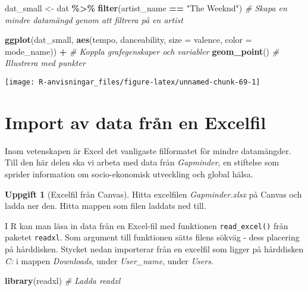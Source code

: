 \documentclass[
]{book}
\newenvironment{Shaded}{\begin{snugshade}}{\end{snugshade}}
\newcommand{\AttributeTok}[1]{\textcolor[rgb]{0.13,0.29,0.53}{#1}}
\newcommand{\CommentTok}[1]{\textcolor[rgb]{0.56,0.35,0.01}{\textit{#1}}}
\newcommand{\FunctionTok}[1]{\textcolor[rgb]{0.13,0.29,0.53}{\textbf{#1}}}
\newcommand{\NormalTok}[1]{#1}
\newcommand{\OtherTok}[1]{\textcolor[rgb]{0.56,0.35,0.01}{#1}}
\newcommand{\SpecialCharTok}[1]{\textcolor[rgb]{0.81,0.36,0.00}{\textbf{#1}}}
\newcommand{\StringTok}[1]{\textcolor[rgb]{0.31,0.60,0.02}{#1}}
\theoremstyle{definition}
\theoremstyle{definition}
\theoremstyle{definition}
\newtheorem{exercise}{Uppgift}[chapter]
\theoremstyle{definition}
\theoremstyle{remark}
\begin{document}
\begin{Shaded}
\begin{Highlighting}[]
\NormalTok{dat\_small }\OtherTok{\textless{}{-}}\NormalTok{ dat }\SpecialCharTok{\%\textgreater{}\%} \FunctionTok{filter}\NormalTok{(artist\_name }\SpecialCharTok{==} \StringTok{"The Weeknd"}\NormalTok{)                            }\CommentTok{\# Skapa en mindre datamängd genom att filtrera på en artist}

\FunctionTok{ggplot}\NormalTok{(dat\_small, }\FunctionTok{aes}\NormalTok{(tempo, danceability, }\AttributeTok{size =}\NormalTok{ valence, }\AttributeTok{color =}\NormalTok{ mode\_name)) }\SpecialCharTok{+}    \CommentTok{\# Koppla grafegenskaper och variabler}
  \FunctionTok{geom\_point}\NormalTok{()                                                                      }\CommentTok{\# Illustrera med punkter}
\end{Highlighting}
\end{Shaded}

\begin{center}\texttt{[image: R-anvisningar\_files/figure-latex/unnamed-chunk-69-1]} \end{center}

\hypertarget{import-av-data-fruxe5n-en-excelfil}{%
\section{Import av data från en Excelfil}\label{import-av-data-fruxe5n-en-excelfil}}

Inom vetenskapen är Excel det vanligaste filformatet för mindre datamängder. Till den här delen ska vi arbeta med data från \emph{Gapminder}, en stiftelse som sprider information om socio-ekonomisk utveckling och global hälsa.

\begin{exercise}[Excelfil från Canvas]
Hitta excelfilen \emph{Gapminder.xlsx} på Canvas och ladda ner den. Hitta mappen som filen laddats ned till.
\end{exercise}

I R kan man läsa in data från en Excel-fil med funktionen \texttt{read\_excel()} från paketet \texttt{readxl}. Som argument till funktionen sätts filens sökväg - dess placering på hårddisken. Stycket nedan importerar från en excelfil som ligger på hårddisken \emph{C:} i mappen \emph{Downloads}, under \emph{User\_name}, under \emph{Users}.

\begin{Shaded}
\begin{Highlighting}[]
\FunctionTok{library}\NormalTok{(readxl)                                                           }\CommentTok{\# Ladda readxl}
\end{Highlighting}
\end{Shaded}
\end{document}
